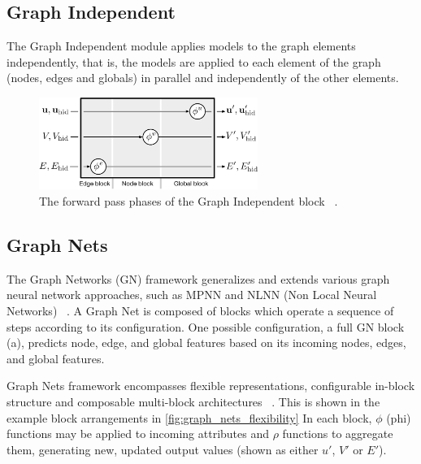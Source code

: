 \subsection{Graph Independent}

The Graph Independent module applies models to the graph elements independently, that is, the models are applied to each element of the graph (nodes, edges and globals) in parallel and independently of the other elements.

\begin{figure}[!htb]
    \centering
    \includegraphics[height=3.0cm]{fig/content/graph_nets/blocks/independent.pdf}
    \caption{The forward pass phases of the Graph Independent block ~\cite{Battaglia_2018}.}
\end{figure}

\subsection{Graph Nets}

The Graph Networks (GN) framework generalizes and extends various graph neural network approaches, such as MPNN and NLNN (Non Local Neural Networks) ~\cite{Battaglia_2018}. A Graph Net is composed of blocks which operate a sequence of steps according to its configuration. One possible configuration, a full GN block (a), predicts node, edge, and global features based on its incoming nodes, edges, and global features.

Graph Nets framework encompasses flexible representations, configurable in-block structure and composable multi-block architectures ~\cite{Battaglia_2018}. This is shown in the example block arrangements in \ref{fig:graph_nets_flexibility} In each block, $\phi$ (phi) functions may be applied to incoming attributes and $\rho$ functions to aggregate them, generating new, updated output values (shown as either $u'$, $V'$ or $E'$).

